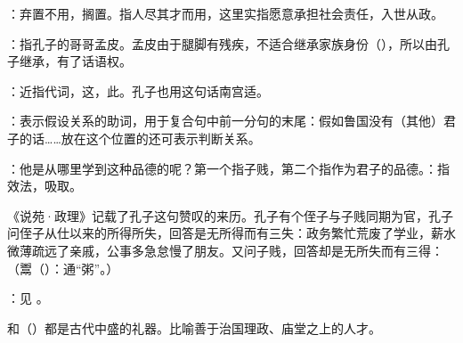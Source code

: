 {
\item {}：弃置不用，搁置。指人尽其才而用，这里实指愿意承担社会责任，入世从政。
\item {}：指孔子的哥哥孟皮。孟皮由于腿脚有残疾，不适合继承家族身份（），所以由孔子继承，有了话语权。%
}
{}  %


{
\item {}：近指代词，这，此。孔子也用这句话南宫适。

\item {}：表示假设关系的助词，用于复合句中前一分句的末尾：假如鲁国没有（其他）君子的话……放在这个位置的还可表示判断关系。
\item {}：他是从哪里学到这种品德的呢？第一个指子贱，第二个指作为君子的品德。：指效法，吸取。

《说苑·政理》记载了孔子这句赞叹的来历。孔子有个侄子与子贱同期为官，孔子问侄子从仕以来的所得所失，回答是无所得而有三失：政务繁忙荒废了学业，薪水微薄疏远了亲戚，公事多急怠慢了朋友。又问子贱，回答却是无所失而有三得：（鬻（）：通“粥”。）
}
{}


{
\item {}：见  。
\item {}和（）都是古代中盛的礼器。比喻善于治国理政、庙堂之上的人才。
}
{}


